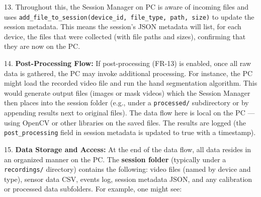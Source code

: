 13. Throughout this, the Session Manager on PC is aware of incoming
    files and uses
    \texttt{add_file_to_session(device_id, file_type, path, size)} to update
    the session
    metadata\cite{ref58}\cite{ref59}.
    This means the session's JSON metadata will list, for each device,
    the files that were collected (with file paths and sizes),
    confirming that they are now on the PC.

14. \textbf{Post-Processing Flow:} If post-processing (FR-13) is enabled,
    once all raw data is gathered, the PC may invoke additional
    processing. For instance, the PC might load the recorded video file
    and run the hand segmentation algorithm. This would generate output
    files (images or mask videos) which the Session Manager then places
    into the session folder (e.g., under a \texttt{processed/} subdirectory or
    by appending results next to original files). The data flow here is
    local on the PC --- using OpenCV or other libraries on the saved
    files. The results are logged (the \texttt{post_processing} field in
    session metadata is updated to true with a
    timestamp\cite{ref60}\cite{ref61}).

15. \textbf{Data Storage and Access:} At the end of the data flow, all data
    resides in an organized manner on the PC. The \textbf{session folder}
    (typically under a \texttt{recordings/} directory) contains the following:
    video files (named by device and type), sensor data CSV, events log,
    session metadata JSON, and any calibration or processed data
    subfolders. For example, one might see:

